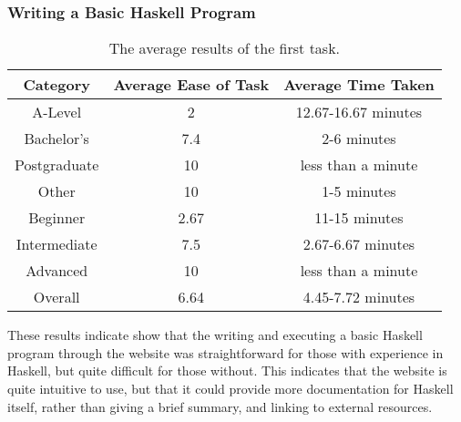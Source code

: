 \documentclass[../main.tex]{subfiles}
\begin{document}
            \subsubsection{Writing a Basic Haskell Program}
                \begin{table}[H]
                    \centering
                    \begin{tabular}{c|c|c}
                        \textbf{Category} & \textbf{Average Ease of Task} & \textbf{Average Time Taken} \\
                        \hline
                        A-Level           & 2                             & 12.67-16.67 minutes         \\
                        Bachelor's        & 7.4                           & 2-6 minutes                 \\
                        Postgraduate      & 10                            & less than a minute          \\
                        Other             & 10                            & 1-5 minutes                 \\
                        \hline
                        Beginner          & 2.67                          & 11-15 minutes               \\
                        Intermediate      & 7.5                           & 2.67-6.67 minutes           \\
                        Advanced          & 10                            & less than a minute          \\
                        \hline
                        Overall           & 6.64                          & 4.45-7.72 minutes           \\
                    \end{tabular}
                    \caption{The average results of the first task.}
                \end{table}

                These results indicate show that the writing and executing a basic Haskell
                    program through the website was straightforward for those with experience in
                    Haskell, but quite difficult for those without.
                This indicates that the website is quite intuitive to use, but that it could
                    provide more documentation for Haskell itself, rather than giving a brief
                    summary, and linking to external resources.
\end{document}
